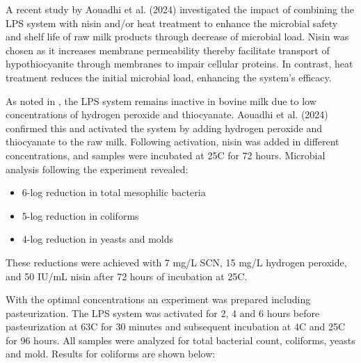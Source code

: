 \vline

A recent study by Aouadhi et al. (2024) investigated the impact of combining the LPS system with nisin and/or heat treatment to enhance the microbial safety and shelf life of raw milk products through decrease of microbial load. 
Nisin was chosen as it increases membrane permeability thereby facilitate transport of hypothiocyanite through membranes to impair cellular proteins. In contrast, heat treatment reduces the initial microbial load, enhancing the system's efficacy.

\vline

As noted in \cite*{RM_01}, the LPS system remains inactive in bovine milk due to low concentrations of hydrogen peroxide and thiocyanate. Aouadhi et al. (2024) confirmed this and activated the system by adding hydrogen peroxide and thiocyanate to the raw milk. Following activation, nisin was added in different concentrations, and samples were incubated at 25\textdegree C for 72 hours. Microbial analysis following the experiment revealed:
\begin{itemize}
    \item 6-log reduction in total mesophilic bacteria
    \item 5-log reduction in coliforms
    \item 4-log reduction in yeasts and molds
\end{itemize}


These reductions were achieved with 7 mg/L SCN, 15 mg/L hydrogen peroxide, and 50 IU/mL nisin after 72 hours of incubation at 25\textdegree C. 

\vline 

With the optimal concentrations an experiment was prepared including pasteurization. The LPS system was activated for 2, 4 and 6 hours before pasteurization at 63\textdegree C for 30 minutes and subsequent incubation at 4\textdegree C and 25\textdegree C for 96 hours. All samples were analyzed for total bacterial count, coliforms, yeasts and mold. Results for coliforms are shown below:

